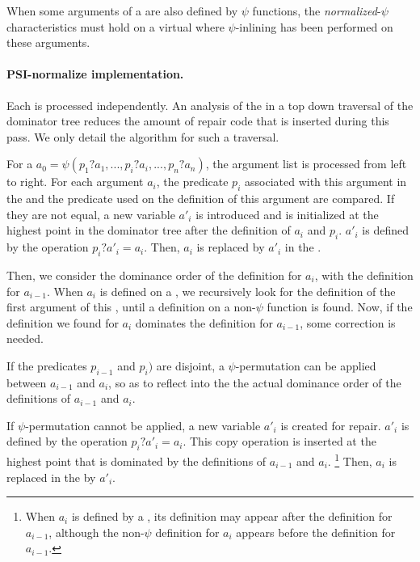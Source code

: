 When some arguments of a \psifun are also defined by $\psi$
functions, the {\em normalized}-$\psi$ characteristics must hold on a
virtual \psifun where $\psi$-inlining has been performed on
these arguments.

\paragraph{PSI-normalize implementation.}

Each \psifun is processed independently. An analysis of the
\psifuns in a top down traversal of the dominator tree
reduces the amount of repair code that is inserted during this pass. We
only detail the algorithm for such a traversal.

For a \psifun ${a_0 = \psi(p_1?a_1, ..., p_i?a_i, ...,
  p_n?a_n)}$, the argument list is processed from left to right. For
each argument ${a_i}$, the predicate ${p_i}$ associated with this argument
in the \psifun and the predicate used on the definition of
this argument are compared. If they are not equal, a new variable
${a'_i}$ is introduced and is initialized at the highest point in the
dominator tree after the definition of ${a_i}$ and ${p_i}$. ${a'_i}$ is
defined by the operation ${p_i? a'_i = a_i}$. Then, ${a_i}$ is
replaced by ${a'_i}$ in the \psifun.

Then, we consider the dominance order of the definition for ${a_i}$,
with the definition for ${a_{i-1}}$. When ${a_i}$ is defined on a
\psifun, we recursively look for the definition of the first
argument of this \psifun, until a definition on a non-$\psi$
function is found. Now, if the definition we found for ${a_i}$
dominates the definition for ${a_{i-1}}$, some correction is needed.

If the predicates ${p_{i-1}}$ and ${p_i})$ are disjoint, a
$\psi$-permutation can be applied between ${a_{i-1}}$ and
${a_i}$, so as to reflect into the \psifun the actual
dominance order of the definitions of ${a_{i-1}}$ and ${a_i}$.

If $\psi$-permutation cannot be applied, a new variable ${a'_i}$
is created for repair. ${a'_i}$ is defined by the operation
${p_i? a'_i = a_i}$. This copy operation is inserted at the highest
point that is dominated by the definitions of ${a_{i-1}}$ and
${a_i}$.
\footnote{When ${a_i}$ is defined by a \psifun, its
  definition may appear after the definition for ${a_{i-1}}$,
  although the non-$\psi$ definition for ${a_i}$ appears before
  the definition for ${a_{i-1}}$.}
Then, ${a_i}$ is replaced in the \psifun by ${a'_i}$.

